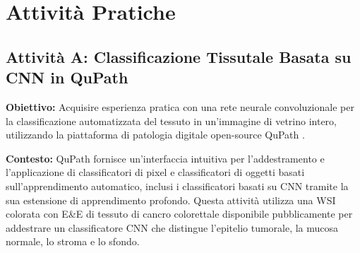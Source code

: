 \section{Attività Pratiche}
\label{sec:ch4_practical}

\subsection{Attività A: Classificazione Tissutale Basata su CNN in QuPath}

\textbf{Obiettivo:} Acquisire esperienza pratica con una rete neurale convoluzionale per la classificazione automatizzata del tessuto in un'immagine di vetrino intero, utilizzando la piattaforma di patologia digitale open-source QuPath \cite{bankhead2022}.

\textbf{Contesto:} QuPath fornisce un'interfaccia intuitiva per l'addestramento e l'applicazione di classificatori di pixel e classificatori di oggetti basati sull'apprendimento automatico, inclusi i classificatori basati su CNN tramite la sua estensione di apprendimento profondo. Questa attività utilizza una WSI colorata con E\&E di tessuto di cancro colorettale disponibile pubblicamente per addestrare un classificatore CNN che distingue l'epitelio tumorale, la mucosa normale, lo stroma e lo sfondo.

